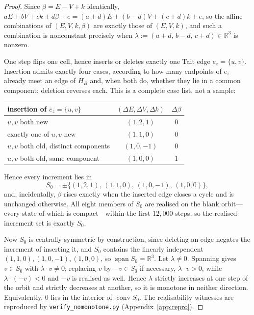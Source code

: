 \documentclass[11pt,reqno]{amsart}
\theoremstyle{plain}
\theoremstyle{definition}
\begin{document}
\begin{proof}
Since $\beta=E-V+k$ identically,
$aE+bV+ck+d\beta+e=(a+d)E+(b-d)V+(c+d)k+e$, so the affine combinations of
$(E,V,k,\beta)$ are exactly those of $(E,V,k)$, and such a combination is nonconstant
precisely when $\lambda:=(a+d,\,b-d,\,c+d)\in\mathbb{R}^3$ is nonzero.

One step flips one cell, hence inserts or deletes exactly one Tait edge
$e_z=\{u,v\}$. Insertion admits exactly four cases, according to how many endpoints of
$e_z$ already meet an edge of $H_B$ and, when both do, whether they lie in a common
component; deletion reverses each. This is a complete case list, not a sample:
\begin{center}
\begin{tabular}{@{}lcc@{}}
\toprule
insertion of $e_z=\{u,v\}$ & $(\Delta E,\Delta V,\Delta k)$ & $\Delta\beta$\\
\midrule
$u,v$ both new & $(1,2,1)$ & $0$\\
exactly one of $u,v$ new & $(1,1,0)$ & $0$\\
$u,v$ both old, distinct components & $(1,0,-1)$ & $0$\\
$u,v$ both old, same component & $(1,0,0)$ & $1$\\
\bottomrule
\end{tabular}
\end{center}
Hence every increment lies in
\begin{equation}\label{eq:evkdeltas}
S_0=\pm\bigl\{(1,2,1),\,(1,1,0),\,(1,0,-1),\,(1,0,0)\bigr\},
\end{equation}
and, incidentally, $\beta$ rises exactly when the inserted edge closes a cycle and is
unchanged otherwise. All eight members of $S_0$ are realised on the blank orbit---every
state of which is compact---within the first $12{,}000$ steps, so the realised
increment set is exactly $S_0$.

Now $S_0$ is centrally symmetric by construction, since deleting an edge negates the
increment of inserting it, and $S_0$ contains the linearly independent
$(1,1,0),(1,0,-1),(1,0,0)$, so $\operatorname{span}S_0=\mathbb{R}^3$. Let
$\lambda\neq0$. Spanning gives $v\in S_0$ with $\lambda\cdot v\neq0$; replacing $v$ by
$-v\in S_0$ if necessary, $\lambda\cdot v>0$, while $\lambda\cdot(-v)<0$ and $-v$ is
realised as well. Hence $\lambda$ strictly increases at one step of the orbit and
strictly decreases at another, so it is monotone in neither direction. Equivalently,
$0$ lies in the interior of $\operatorname{conv}S_0$. The realisability witnesses are
reproduced by \texttt{verify\_nomonotone.py} (Appendix~\ref{app:repro}).
\end{proof}
\end{document}
